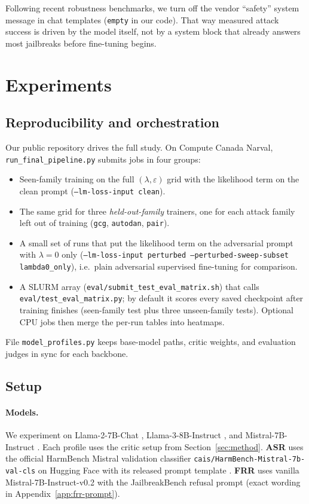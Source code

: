 \documentclass{article}
\begin{document}
Following recent robustness benchmarks, we turn off the vendor ``safety'' system message in chat templates (\texttt{empty} in our code). That way measured attack success is driven by the model itself, not by a system block that already answers most jailbreaks before fine-tuning begins.

\section{Experiments}

\subsection{Reproducibility and orchestration}
Our public repository drives the full study. On Compute Canada Narval, \texttt{run\_final\_pipeline.py} submits jobs in four groups:
\begin{itemize}[leftmargin=*]
  \item Seen-family training on the full $(\lambda,\varepsilon)$ grid with the likelihood term on the clean prompt (\texttt{--lm-loss-input clean}).
  \item The same grid for three \emph{held-out-family} trainers, one for each attack family left out of training (\texttt{gcg}, \texttt{autodan}, \texttt{pair}).
  \item A small set of runs that put the likelihood term on the adversarial prompt with $\lambda{=}0$ only (\texttt{--lm-loss-input perturbed --perturbed-sweep-subset lambda0\_only}), i.e.\ plain adversarial supervised fine-tuning for comparison.
  \item A SLURM array (\texttt{eval/submit\_test\_eval\_matrix.sh}) that calls \texttt{eval/test\_eval\_matrix.py}; by default it scores every saved checkpoint after training finishes (seen-family test plus three unseen-family tests). Optional CPU jobs then merge the per-run tables into heatmaps.
\end{itemize}
File \texttt{model\_profiles.py} keeps base-model paths, critic weights, and evaluation judges in sync for each backbone.

\subsection{Setup}
\label{sec:exp-setup}

\paragraph{Models.}
We experiment on Llama-2-7B-Chat \citep{touvron2023llama2}, Llama-3-8B-Instruct \citep{grattafiori2024llama3}, and Mistral-7B-Instruct \citep{jiang2023mistral}. Each profile uses the critic setup from Section~\ref{sec:method}. \textbf{ASR} uses the official HarmBench Mistral validation classifier \texttt{cais/HarmBench-Mistral-7b-val-cls} on Hugging Face with its released prompt template \citep{mazeika2024harmbench}. \textbf{FRR} uses vanilla Mistral-7B-Instruct-v0.2 \citep{jiang2023mistral} with the JailbreakBench refusal prompt \citep{chao2024jailbreakbench} (exact wording in Appendix~\ref{app:frr-prompt}).
\end{document}
